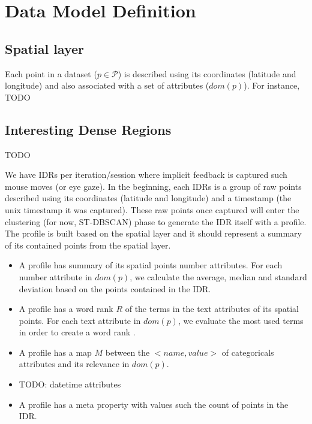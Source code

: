 \chapter{Data Model Definition}
\label{chap:model}

\section{Spatial layer}

Each point in a dataset ($p \in \mathcal{P}$) is described using its coordinates (latitude and longitude) and also associated with a set of attributes ($dom(p)$). For instance, TODO

\section{Interesting Dense Regions}

TODO

We have IDRs per iteration/session where implicit feedback is captured such mouse moves (or eye gaze). In the beginning, each IDRs is a group of raw points described using its coordinates (latitude and longitude) and a timestamp (the unix timestamp it was captured). These raw points once captured will enter the clustering (for now, ST-DBSCAN) phase to generate the IDR itself with a profile. The profile is built based on the spatial layer and it should represent a summary of its contained points from the spatial layer.

\begin{itemize}
	\item A profile has summary of its spatial points number attributes. For each number attribute in $dom(p)$, we calculate the average, median and standard deviation based on the points contained in the IDR.

	\item A profile has a word rank $R$ of the terms in the text attributes of its spatial points. For each text attribute in $dom(p)$, we evaluate the most used terms in order to create a word rank \cite{kumar2017}.

	\item A profile has a map $M$ between the $<name, value>$ of categoricals attributes and its relevance in $dom(p)$.

	\item TODO: datetime attributes

	\item A profile has a meta property with values such the count of points in the IDR.
\end{itemize}
